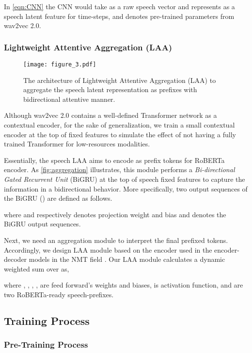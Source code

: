 \documentclass[letterpaper]{article} \usepackage{spconf,amsmath,graphicx}
\begin{document}
In \autoref{eqn:CNN} the CNN would take  as a raw speech vector and represents  as a speech latent feature for  time-steps, and   denotes pre-trained parameters from wav2vec 2.0.

\subsubsection{Lightweight Attentive Aggregation (LAA)}


\begin{figure}[tp]
\centering
\texttt{[image: figure\_3.pdf]} \caption{The architecture of Lightweight Attentive Aggregation (LAA) to aggregate the speech latent representation as prefixes with bidirectional attentive manner.}
\label{fig:aggregation}
\end{figure}

Although wav2vec 2.0 contains a well-defined Transformer network as a contextual encoder, for the sake of generalization, we train a small contextual encoder at the top of fixed features to simulate the effect of not having a fully trained Transformer for low-resources modalities.

Essentially, the speech LAA aims to encode  as prefix tokens for RoBERTa encoder. As \autoref{fig:aggregation} illustrates, this module performs a \textit{Bi-directional Gated Recurrent Unit} (BiGRU) at the top of speech fixed features to capture the information in a bidirectional behavior. More specifically, two output sequences of the BiGRU () are defined as follows.



where  and  respectively denotes projection weight and bias and  denotes the BiGRU output sequences.


Next, we need an aggregation module to interpret the final prefixed tokens. Accordingly, we design LAA module based on the encoder used in the encoder-decoder models in the NMT field \cite{bahdanau2014neural}. Our LAA module calculates a dynamic weighted sum over  as,







where , , , , are feed forward's weights and biases,  is activation function, and  are two RoBERTa-ready speech-prefixes. 

\subsection{Training Process}
\subsubsection{Pre-Training Process}
\end{document}
